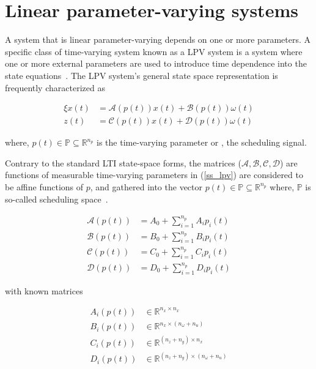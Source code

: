 \section{Linear parameter-varying systems} 
\label{sec_linear_parameter_varying_systems}

A system that is linear parameter-varying depends on one or more parameters. A specific class of time-varying system known as a LPV system is a system where one or more external parameters are used to introduce time dependence into the state equations~\citep{wood1995control}. The LPV system's general state space representation is frequently characterized as

\begin{subequations} \label{ss_lpv}
	\begin{align}
		\xi x(t) &= \mathcal{A}(p(t))x(t) + \mathcal{B}(p(t))\omega(t) 
		\\
		z(t) &=	\mathcal{C}(p(t))x(t) + \mathcal{D}(p(t))\omega(t)
	\end{align}
\end{subequations}
	
where, $p(t) \in \mathbb{P} \subseteq \mathbb{R}^{n_p}$ is the time-varying parameter or \ie , the scheduling signal.

Contrary to the standard LTI state-space forms, the matrices ($\mathcal{A, B, C, D}$) are functions of measurable time-varying parameters in (\ref{ss_lpv}) are considered to be affine functions of $p$, and gathered into the vector $p(t) \in \mathbb{P} \subseteq \mathbb{R}^{n_p}$ where, $\mathbb{P}$ is so-called scheduling space~\citep{mercere2012identification}. 

\begin{subequations}
	\begin{align}
		\mathcal{A}(p(t)) &= A_0 + \sum_{i=1}^{n_p} A_i p_i(t) 
		\\
		\mathcal{B}(p(t)) &= B_0 + \sum_{i=1}^{n_p} B_i p_i(t) 
		\\
		\mathcal{C}(p(t)) &= C_0 + \sum_{i=1}^{n_p} C_i p_i(t) 
		\\
		\mathcal{D}(p(t)) &= D_0 + \sum_{i=1}^{n_p} D_i p_i(t)
	\end{align}
\end{subequations}

with known matrices

\begin{subequations}
		\begin{align}
			A_i (p(t)) &\in \mathbb{R}^{n_x \times n_x}
			\\
			B_i (p(t)) &\in \mathbb{R}^{n_x \times (n_\omega + n_u)}
			\\
			C_i (p(t)) &\in \mathbb{R}^{(n_z + n_y) \times n_x}
			\\
			D_i (p(t)) &\in \mathbb{R}^{(n_z + n_y) \times (n_\omega + n_u)}
		\end{align}
\end{subequations}

